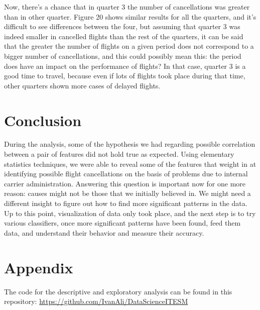 \documentclass{article}
\begin{document}
    Now, there's a chance that in quarter 3 the number of cancellations was greater than in other quarter. Figure 20 shows similar results for all the quarters, and it's difficult to see differences between the four, but assuming that quarter 3 was indeed smaller in cancelled flights than the rest of the quarters, it can be said that the greater the number of flights on a given period does not correspond to a bigger number of cancellations, and this could possibly mean this: the period does have an impact on the performance of flights? In that case, quarter 3 is a good time to travel, because even if lots of flights took place during that time, other quarters shown more cases of delayed flights.\newline





    \section{Conclusion}
    During the analysis, some of the hypothesis we had regarding possible correlation between
    a pair of features did not hold true as expected. Using elementary statistics techniques,
    we were able to reveal some of the features that weight in at identifying possible
    flight cancellations on the basis of problems due to internal carrier administration.\newline
    Answering this question is important now for one more reason: causes might not be those
    that we initially believed in. We might need a different insight to figure out how to
    find more significant patterns in the data. Up to this point, visualization of data
    only took place, and the next step is to try various classifiers, once more significant patterns
    have been found, feed them data, and understand their behavior and measure their accuracy.

    \section{Appendix}
    The code for the descriptive and exploratory analysis can be found in this repository: \url{https://github.com/IvanAli/DataScienceITESM}
\end{document}
